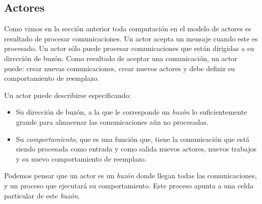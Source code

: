 
\subsection{Actores}

Como vimos en la sección anterior toda computación en el modelo de actores es resultado de procesar comunicaciones. Un actor acepta un mensaje cuando este es procesado. Un actor sólo puede procesar comunicaciones que están dirigidas a su dirección de buzón. Como resultado de aceptar una comunicación, un actor puede: crear nuevas comunicaciones, crear nuevos actores y debe definir su comportamiento de reemplazo.


Un actor puede describirse especificando:

\begin{itemize}
 \item Su dirección de buzón, a la que le corresponde un \textit{buzón} lo suficientemente grande para almacenar las comunicaciones aún no procesadas.
 \item Su \textit{comportamiento}, que es una función que, tiene la comunicación que está siendo procesada como entrada y como salida nuevos actores, nuevos trabajos y su nuevo comportamiento de reemplazo.
\end{itemize}

Podemos pensar que un actor es un \textit{buzón} donde llegan todas las comunicaciones, y un proceso que ejecutará su comportamiento. Este proceso apunta a una celda particular de este \textit{buzón}. 

% 
% 
% 
% 
% 
% 
% 
% 

